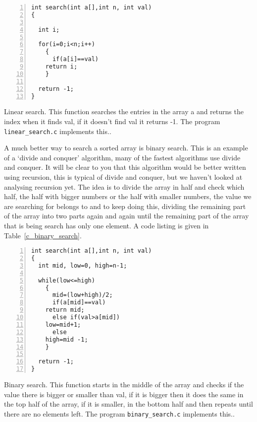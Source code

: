 \documentclass[11pt,a4paper]{scrartcl}
\begin{document}
\begin{table}
\begin{lstlisting}[numbers=left]
int search(int a[],int n, int val)
{

  int i;

  for(i=0;i<n;i++)
    {
      if(a[i]==val)
	return i;
    }

  return -1;
}
\end{lstlisting}
\caption{Linear search. This function searches the entries in the array a and returns the index when it finds val, if it doesn't find val it returns -1. The program {\tt linear\_search.c} implements this.\label{c_linear_search}.}
\end{table}

A much better way to search a sorted array is binary search. This is
an example of a \lq{}divide and conquer\rq{} algorithm, many of the
fastest algorithms use divide and conquer. It will be clear to you
that this algorithm would be better written using recursion, this is
typical of divide and conquer, but we haven't looked at analysing
recursion yet. The idea is to divide the array in half and check which
half, the half with bigger numbers or the half with smaller numbers,
the value we are searching for belongs to and to keep doing this,
dividing the remaining part of the array into two parts again and again
until the remaining part of the array that is being search has only
one element. A code listing is given in Table~\ref{c_binary_search}.

\begin{table}
\begin{lstlisting}[numbers=left] 
int search(int a[],int n, int val)
{
  int mid, low=0, high=n-1;

  while(low<=high)
    {
      mid=(low+high)/2;
      if(a[mid]==val)
	return mid;
      else if(val>a[mid])
	low=mid+1;
      else
	high=mid -1;
    }

  return -1;
}
\end{lstlisting}
\caption{Binary search. This function starts in the middle of the array
  and checks if the value there is bigger or smaller than val, if it
  is bigger then it does the same in the top half of the array, if it
  is smaller, in the bottom half and then repeats until there are no
  elements left. The program {\tt binary\_search.c} implements
  this.\label{c_binary_search}.}
\end{table}
\end{document}

